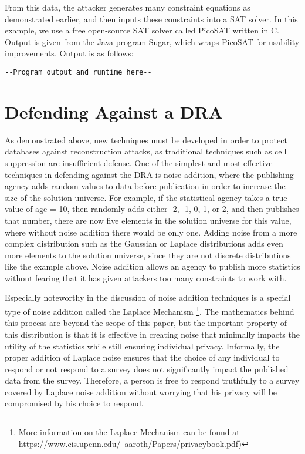 \documentclass[jou,apacite]{apa6}
\begin{document}
From this data, the attacker generates many constraint equations as demonstrated earlier,
and then inputs these constraints into a SAT solver. In this example, we use a free open-source SAT solver
called PicoSAT written in C. Output is given from the Java program Sugar\cite{sugar}, which wraps PicoSAT for usability improvements.
\newline Output is as follows:
\begin{verbatim}
--Program output and runtime here--
\end{verbatim}

\section{Defending Against a DRA}
As demonstrated above, new techniques must be developed in
order to protect databases against reconstruction attacks, as traditional techniques such as cell suppression are insufficient defense. One of the simplest and most effective techniques in defending against the DRA is noise addition, where the publishing agency adds random values to data before publication in order to increase the size of the solution universe. For example, if the statistical agency takes a true value of age = 10, then randomly adds either -2, -1, 0, 1, or 2, and then publishes that number, there are now five elements in the solution universe for this value, where without noise addition there would be only one. Adding noise from a more complex distribution such as the Gaussian or Laplace distributions adds even more elements to the solution universe, since they are not discrete distributions like the example above. Noise addition allows an agency to publish more statistics without fearing that it has given attackers too many constraints to work with.

Especially noteworthy in the discussion of noise addition techniques is a special type of noise addition called the Laplace Mechanism \footnote{More information on the Laplace Mechanism can be found at https://www.cis.upenn.edu/~aaroth/Papers/privacybook.pdf)}.
The mathematics behind this process are beyond the scope of this paper, but the important property of this distribution is that it is effective in creating noise that minimally impacts the utility of the statistics while still ensuring individual privacy. Informally, the proper addition of Laplace noise ensures that the choice of any individual to respond or not respond to a survey does not significantly impact the published data from the survey. Therefore, a person is free to respond truthfully to a survey covered by Laplace noise addition without worrying that his privacy will be compromised by his choice to respond.
\end{document}
